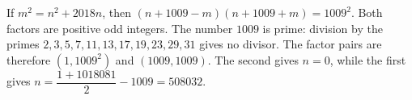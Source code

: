 If $m^2=n^2+2018n$, then $(n+1009-m)(n+1009+m)=1009^2$. Both factors are positive odd integers. The number $1009$ is prime: division by the primes $2,3,5,7,11,13,17,19,23,29,31$ gives no divisor. The factor pairs are therefore $(1,1009^2)$ and $(1009,1009)$. The second gives $n=0$, while the first gives $n=\dfrac{1+1018081}{2}-1009=\boxed{508032}$.
